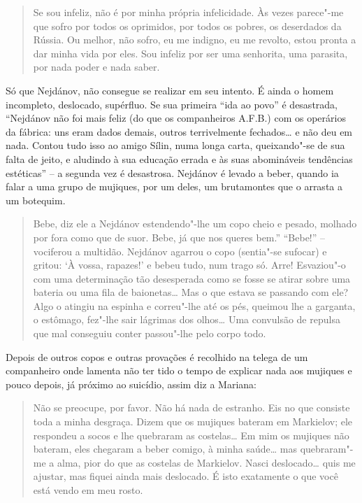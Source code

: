 \begin{quote}
Se sou infeliz, não é por minha própria infelicidade. Às vezes parece"-me
que sofro por todos os oprimidos, por todos os pobres, os deserdados da
Rússia. Ou melhor, não sofro, eu me indigno, eu me revolto, estou pronta
a dar minha vida por eles. Sou infeliz por ser uma senhorita, uma
parasita, por nada poder e nada saber.
\end{quote}

Só que Nejdánov, não consegue se realizar em seu intento. É ainda o
homem incompleto, deslocado, supérfluo. Se sua primeira ``ida ao povo''
é desastrada, ``Nejdánov não foi mais feliz (do que os companheiros
A.F.B.) com os operários da fábrica: uns eram dados demais, outros
terrivelmente fechados\ldots{} e não deu em nada. Contou tudo isso ao amigo
Sílin, numa longa carta, queixando"-se de sua falta de jeito, e aludindo
à sua educação errada e às suas abomináveis tendências estéticas'' -- a
segunda vez é desastrosa. Nejdánov é levado a beber, quando ia falar a
uma grupo de mujiques, por um deles, um brutamontes que o arrasta a um
botequim.

\begin{quote}
Bebe, diz ele a Nejdánov estendendo"-lhe um copo cheio e pesado, molhado
por fora como que de suor. Bebe, já que nos queres bem.'' ``Bebe!'' --
vociferou a multidão. Nejdánov agarrou o copo (sentia"-se sufocar) e
gritou: `À vossa, rapazes!' e bebeu tudo, num trago só. Arre! Esvaziou"-o
com uma determinação tão desesperada como se fosse se atirar sobre uma
bateria ou uma fila de baionetas\ldots{} Mas o que estava se passando com
ele? Algo o atingiu na espinha e correu"-lhe até os pés, queimou lhe a
garganta, o estômago, fez"-lhe sair lágrimas dos olhos\ldots{} Uma convulsão
de repulsa que mal conseguiu conter passou"-lhe pelo corpo todo.
\end{quote}

Depois de outros copos e outras provações é recolhido na telega de um
companheiro onde lamenta não ter tido o tempo de explicar nada aos
mujiques e pouco depois, já próximo ao suicídio, assim diz a Mariana:

\begin{quote}
Não se preocupe, por favor. Não há nada de estranho. Eis no que consiste
toda a minha desgraça. Dizem que os mujiques bateram em Markielov; ele
respondeu a socos e lhe quebraram as costelas\ldots{} Em mim os mujiques não
bateram, eles chegaram a beber comigo, à minha saúde\ldots{} mas quebraram"-me
a alma, pior do que as costelas de Markielov. Nasci deslocado\ldots{} quis me
ajustar, mas fiquei ainda mais deslocado. É isto exatamente o que você
está vendo em meu rosto.
\end{quote}

